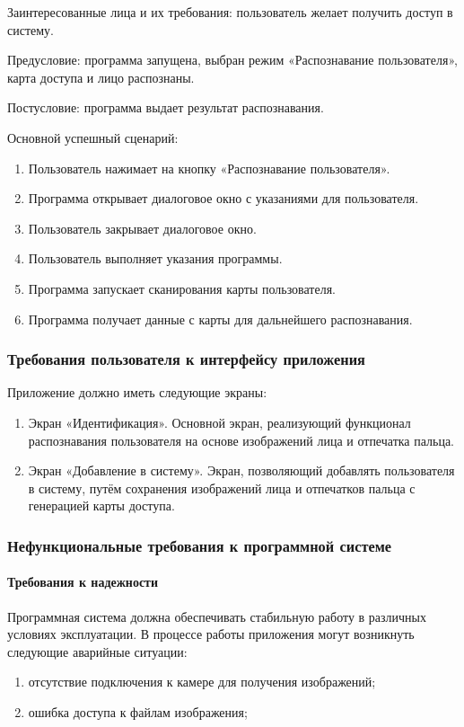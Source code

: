 Заинтересованные лица и их требования: пользователь желает получить доступ в систему.

Предусловие: программа запущена, выбран режим «Распознавание пользователя», карта доступа и лицо распознаны.

Постусловие: программа выдает результат распознавания.

Основной успешный сценарий:
\begin{enumerate}
	\item Пользователь нажимает на кнопку «Распознавание пользователя».
	\item Программа открывает диалоговое окно с указаниями для пользователя.
	\item Пользователь закрывает диалоговое окно.
	\item Пользователь выполняет указания программы.
	\item Программа запускает сканирования карты пользователя.
	\item Программа получает данные с карты для дальнейшего распознавания.
\end{enumerate}


\subsubsection{Требования пользователя к интерфейсу приложения}

 Приложение должно иметь следующие экраны:
 
 \begin{enumerate}
 	\item Экран «Идентификация». Основной экран, реализующий
 	функционал распознавания пользователя на основе изображений лица и отпечатка пальца.
 	\item Экран «Добавление в систему». Экран, позволяющий добавлять пользователя в систему, путём сохранения изображений лица и отпечатков пальца с генерацией карты доступа.
 \end{enumerate}


\subsubsection{Нефункциональные требования к программной системе}

\paragraph {Требования к надежности}

Программная система должна обеспечивать стабильную работу в различных условиях эксплуатации. В процессе работы приложения могут возникнуть следующие аварийные ситуации:
\begin{enumerate}
	\item отсутствие подключения к камере для получения изображений;
	\item ошибка доступа к файлам изображения;
\end{enumerate}

